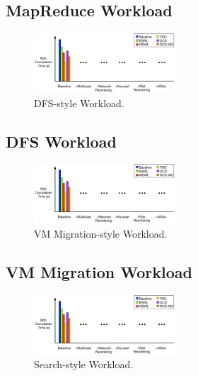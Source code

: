 \subsection{MapReduce Workload}
\label{sec:eval_MR}






\begin{figure}[t!!!]
\centering
\includegraphics[width=0.47\textwidth]{figures/eval/map_red}
\caption{DFS-style Workload.}
\label{fig:eval_DFS}
\end{figure}

\subsection{DFS Workload}
\label{sec:eval_DFS}






\newpage\phantom{t}
\begin{figure}[t!!!]
\centering
\includegraphics[width=0.47\textwidth]{figures/eval/map_red}
\caption{VM Migration-style Workload.}
\label{fig:eval_VM}
\end{figure}

\subsection{VM Migration Workload}
\label{sec:eval_VM}








\begin{figure}[t!!!]
\centering
\includegraphics[width=0.47\textwidth]{figures/eval/map_red}
\caption{Search-style Workload.}
\label{fig:eval_search}
\end{figure}

